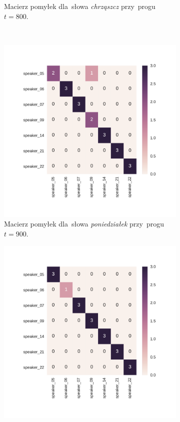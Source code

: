 \documentclass[11pt,a4paper]{article}
\begin{document}
\begin{figure}
\begin{subfigure}[t]{0.45\textwidth}
        \caption{Macierz pomyłek dla~słowa \emph{chrząszcz} przy~progu~$t = 800$.}
    \end{subfigure}
    \\
    \begin{subfigure}[t]{0.45\textwidth}
        \includegraphics[width=\textwidth]{res/plots/confusion_matrix_poniedzialek.pdf}
        \caption{Macierz pomyłek dla~słowa \emph{poniedziałek} przy~progu~$t = 900$.}
    \end{subfigure}
    \qquad
    \begin{subfigure}[t]{0.45\textwidth}
        \includegraphics[width=\textwidth]{res/plots/confusion_matrix_wycieczka.pdf}

\end{subfigure}
\end{figure}
\end{document}
